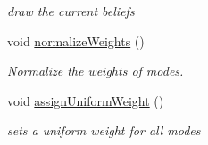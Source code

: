 \begin{DoxyCompactItemize}
\begin{DoxyCompactList}\small\item\em draw the current beliefs \end{DoxyCompactList}\item 
\hypertarget{class_n_b_m3_p_ae785cd0405bb98d27bfc387c5fc77bc4}{void \hyperlink{class_n_b_m3_p_ae785cd0405bb98d27bfc387c5fc77bc4}{normalize\-Weights} ()}\label{class_n_b_m3_p_ae785cd0405bb98d27bfc387c5fc77bc4}

\begin{DoxyCompactList}\small\item\em Normalize the weights of modes. \end{DoxyCompactList}\item 
\hypertarget{class_n_b_m3_p_a24872c915533c3c39c8afd092599eff2}{void \hyperlink{class_n_b_m3_p_a24872c915533c3c39c8afd092599eff2}{assign\-Uniform\-Weight} ()}\label{class_n_b_m3_p_a24872c915533c3c39c8afd092599eff2}

\begin{DoxyCompactList}\small\item\em sets a uniform weight for all modes \end{DoxyCompactList}\end{DoxyCompactItemize}
